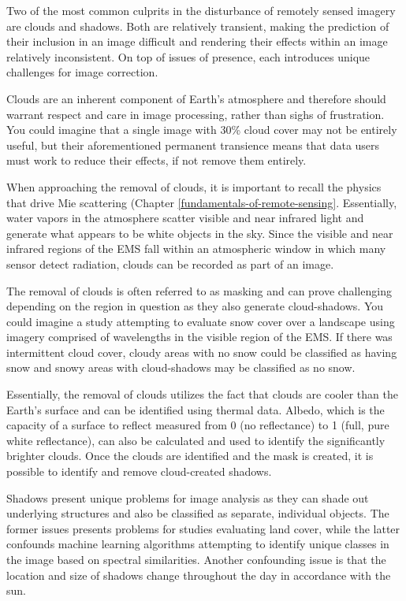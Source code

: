 \documentclass[
]{book}
\begin{document}
Two of the most common culprits in the disturbance of remotely sensed
imagery are clouds and shadows. Both are relatively transient, making
the prediction of their inclusion in an image difficult and rendering
their effects within an image relatively inconsistent. On top of issues
of presence, each introduces unique challenges for image correction.

Clouds are an inherent component of Earth's atmosphere and therefore
should warrant respect and care in image processing, rather than sighs
of frustration. You could imagine that a single image with 30\% cloud
cover may not be entirely useful, but their aforementioned permanent
transience means that data users must work to reduce their effects, if
not remove them entirely.

When approaching the removal of clouds, it is important to recall the
physics that drive Mie scattering (Chapter
\ref{fundamentals-of-remote-sensing}. Essentially, water vapors in the
atmosphere scatter visible and near infrared light and generate what
appears to be white objects in the sky. Since the visible and near
infrared regions of the EMS fall within an atmospheric window in which
many sensor detect radiation, clouds can be recorded as part of an
image.

The removal of clouds is often referred to as masking and can prove
challenging depending on the region in question as they also generate
cloud-shadows. You could imagine a study attempting to evaluate snow
cover over a landscape using imagery comprised of wavelengths in the
visible region of the EMS. If there was intermittent cloud cover, cloudy
areas with no snow could be classified as having snow and snowy areas
with cloud-shadows may be classified as no snow.

Essentially, the removal of clouds utilizes the fact that clouds are
cooler than the Earth's surface and can be identified using thermal
data. Albedo, which is the capacity of a surface to reflect measured
from 0 (no reflectance) to 1 (full, pure white reflectance), can also be
calculated and used to identify the significantly brighter clouds. Once
the clouds are identified and the mask is created, it is possible to
identify and remove cloud-created shadows.

Shadows present unique problems for image analysis as they can shade out
underlying structures and also be classified as separate, individual
objects. The former issues presents problems for studies evaluating land
cover, while the latter confounds machine learning algorithms attempting
to identify unique classes in the image based on spectral similarities.
Another confounding issue is that the location and size of shadows
change throughout the day in accordance with the sun.
\end{document}
